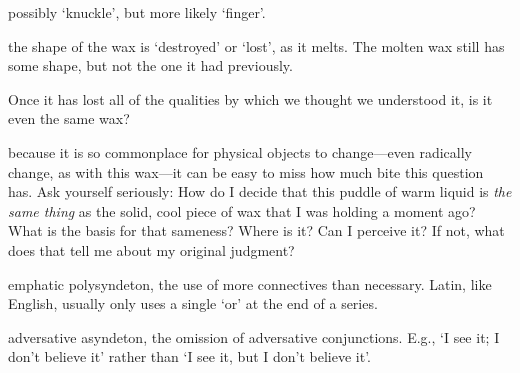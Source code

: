  possibly `knuckle', but more likely `finger'.

 the shape of the wax is `destroyed' or `lost', as it melts. The molten wax still has some shape, but not the one it had previously.

 Once it has lost all of the qualities by which we thought we understood it, is it even the same wax?

 because it is so commonplace for physical objects to change---even radically change, as with this wax---it can be easy to miss how much bite this question has. Ask yourself seriously: How do I decide that this puddle of warm liquid is \textit{the same thing} as the solid, cool piece of wax that I was holding a moment ago? What is the basis for that sameness? Where is it? Can I perceive it? If not, what does that tell me about my original judgment?

 emphatic polysyndeton, the use of more connectives than necessary. Latin, like English, usually only uses a single `or' at the end of a series.

 adversative asyndeton, the omission of adversative conjunctions. E.g., `I see it; I don't believe it' rather than `I see it, but I don't believe it'.

\clearpage

